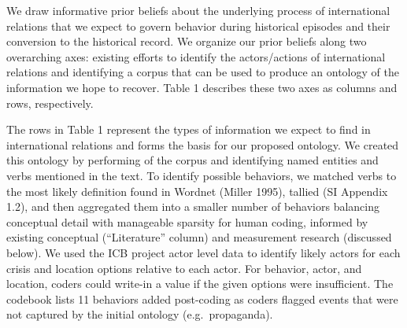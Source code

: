 \documentclass{article}
\begin{document}
We draw informative prior beliefs about the underlying process of
international relations that we expect to govern behavior during
historical episodes and their conversion to the historical record. We
organize our prior beliefs along two overarching axes: existing efforts
to identify the actors/actions of international relations and
identifying a corpus that can be used to produce an ontology of the
information we hope to recover. Table 1 describes these two axes as
columns and rows, respectively.

The rows in Table 1 represent the types of information we expect to find
in international relations and forms the basis for our proposed
ontology. We created this ontology by performing of the corpus and
identifying named entities and verbs mentioned in the text. To identify
possible behaviors, we matched verbs to the most likely definition found
in Wordnet (Miller 1995), tallied (SI Appendix 1.2), and then aggregated
them into a smaller number of behaviors balancing conceptual detail with
manageable sparsity for human coding, informed by existing conceptual
(``Literature'' column) and measurement research (discussed below). We
used the ICB project actor level data to identify likely actors for each
crisis and location options relative to each actor. For behavior, actor,
and location, coders could write-in a value if the given options were
insufficient. The codebook lists 11 behaviors added post-coding as
coders flagged events that were not captured by the initial ontology
(e.g.~propaganda).
\end{document}
